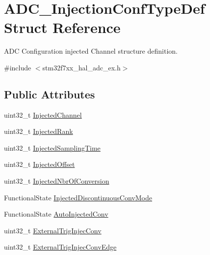 \hypertarget{struct_a_d_c___injection_conf_type_def}{}\section{A\+D\+C\+\_\+\+Injection\+Conf\+Type\+Def Struct Reference}
\label{struct_a_d_c___injection_conf_type_def}


A\+DC Configuration injected Channel structure definition.  




{\ttfamily \#include $<$stm32f7xx\+\_\+hal\+\_\+adc\+\_\+ex.\+h$>$}

\subsection*{Public Attributes}
\begin{DoxyCompactItemize}
\item 
uint32\+\_\+t \mbox{\hyperlink{struct_a_d_c___injection_conf_type_def_aad0cab6ed3f66e8ffa4bd0490298b715}{Injected\+Channel}}
\item 
uint32\+\_\+t \mbox{\hyperlink{struct_a_d_c___injection_conf_type_def_af8a1717c0f5a5d0c7a705224f28a844f}{Injected\+Rank}}
\item 
uint32\+\_\+t \mbox{\hyperlink{struct_a_d_c___injection_conf_type_def_a3d15c0590dbafc9e99e21ea4df5b0c6b}{Injected\+Sampling\+Time}}
\item 
uint32\+\_\+t \mbox{\hyperlink{struct_a_d_c___injection_conf_type_def_ac7d28d71ec3aec4d1587ee04fc585f09}{Injected\+Offset}}
\item 
uint32\+\_\+t \mbox{\hyperlink{struct_a_d_c___injection_conf_type_def_ac59f9795b1b8c4ce6745d99f8231b768}{Injected\+Nbr\+Of\+Conversion}}
\item 
Functional\+State \mbox{\hyperlink{struct_a_d_c___injection_conf_type_def_ab842abce605e1eaf11077fd3825379e0}{Injected\+Discontinuous\+Conv\+Mode}}
\item 
Functional\+State \mbox{\hyperlink{struct_a_d_c___injection_conf_type_def_a39b2ddf75be46eb2d474e261e7b1c875}{Auto\+Injected\+Conv}}
\item 
uint32\+\_\+t \mbox{\hyperlink{struct_a_d_c___injection_conf_type_def_ac3431d4d3e3089f0db271bfb06dbffc0}{External\+Trig\+Injec\+Conv}}
\item 
uint32\+\_\+t \mbox{\hyperlink{struct_a_d_c___injection_conf_type_def_a4f2cfa808b5ace1e47fc3f94da7b850f}{External\+Trig\+Injec\+Conv\+Edge}}
\end{DoxyCompactItemize}


